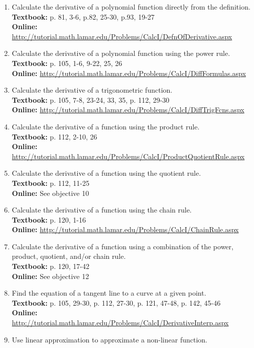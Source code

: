 \documentclass[12pt,landscape]{article}
\begin{document}
\begin{multicols}{2}
\begin{enumerate}
\item Calculate the derivative of a polynomial function directly from the definition.\\
\textbf{Textbook:} p. 81, 3-6, p.82, 25-30, p.93, 19-27\\
\textbf{Online:} \url{http://tutorial.math.lamar.edu/Problems/CalcI/DefnOfDerivative.aspx}
\item Calculate the derivative of a polynomial function using the power rule.\\
\textbf{Textbook:} p. 105, 1-6, 9-22, 25, 26\\
\textbf{Online:} \url{http://tutorial.math.lamar.edu/Problems/CalcI/DiffFormulas.aspx}
\item Calculate the derivative of a trigonometric function.\\
\textbf{Textbook:} p. 105, 7-8, 23-24, 33, 35, p. 112, 29-30\\
\textbf{Online:} \url{http://tutorial.math.lamar.edu/Problems/CalcI/DiffTrigFcns.aspx}
\item Calculate the derivative of a function using the product rule.\\ 
\textbf{Textbook:} p. 112, 2-10, 26\\
\textbf{Online:} \url{http://tutorial.math.lamar.edu/Problems/CalcI/ProductQuotientRule.aspx}
\item Calculate the derivative of a function using the quotient rule.\\
\textbf{Textbook:} p. 112, 11-25\\
\textbf{Online:} See objective 10
\item Calculate the derivative of a function using the chain rule.\\
\textbf{Textbook:} p. 120, 1-16\\
\textbf{Online:} \url{http://tutorial.math.lamar.edu/Problems/CalcI/ChainRule.aspx}
\item Calculate the derivative of a function using a combination of the power, product, quotient, and/or chain rule.\\
\textbf{Textbook:} p. 120, 17-42\\
\textbf{Online:} See objective 12
\item Find the equation of a tangent line to a curve at a given point.\\
\textbf{Textbook:} p. 105, 29-30, p. 112, 27-30, p. 121, 47-48, p. 142, 45-46\\
\textbf{Online:} \url{http://tutorial.math.lamar.edu/Problems/CalcI/DerivativeInterp.aspx}
\item Use linear approximation to approximate a non-linear function.\\

\end{enumerate}
\end{multicols}
\end{document}
